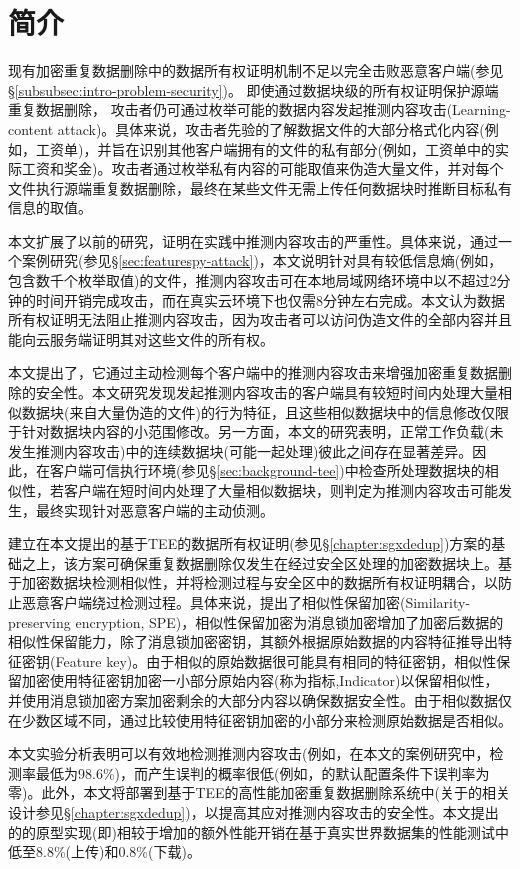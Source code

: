 \section{简介}
\label{sec:featurespy-intro}

现有加密重复数据删除中的数据所有权证明机制不足以完全击败恶意客户端(参见\S\ref{subsubsec:intro-problem-security})。 即使通过数据块级的所有权证明保护源端重复数据删除， 攻击者仍可通过枚举可能的数据内容发起推测内容攻击(Learning-content attack)。具体来说，攻击者先验的了解数据文件的大部分格式化内容(例如，工资单)，并旨在识别其他客户端拥有的文件的私有部分(例如，工资单中的实际工资和奖金)。攻击者通过枚举私有内容的可能取值来伪造大量文件，并对每个文件执行源端重复数据删除，最终在某些文件无需上传任何数据块时推断目标私有信息的取值。

本文扩展了以前的研究，证明在实践中推测内容攻击的严重性。具体来说，通过一个案例研究(参见\S\ref{sec:featurespy-attack})，本文说明针对具有较低信息熵(例如，包含数千个枚举取值)的文件，推测内容攻击可在本地局域网络环境中以不超过2分钟的时间开销完成攻击，而在真实云环境下也仅需8分钟左右完成。本文认为数据所有权证明无法阻止推测内容攻击，因为攻击者可以访问伪造文件的全部内容并且能向云服务端证明其对这些文件的所有权。

本文提出了\sysnameF，它通过主动检测每个客户端中的推测内容攻击来增强加密重复数据删除的安全性。本文研究发现发起推测内容攻击的客户端具有较短时间内处理大量相似数据块(来自大量伪造的文件)的行为特征，且这些相似数据块中的信息修改仅限于针对数据块内容的小范围修改。另一方面，本文的研究表明，正常工作负载(未发生推测内容攻击)中的连续数据块(可能一起处理)彼此之间存在显著差异。因此，\sysnameF 在客户端可信执行环境(参见\S\ref{sec:background-tee})中检查所处理数据块的相似性，若客户端在短时间内处理了大量相似数据块，则判定为推测内容攻击可能发生，最终实现针对恶意客户端的主动侦测。

\sysnameF 建立在本文提出的基于TEE的数据所有权证明(参见\S\ref{chapter:sgxdedup})方案的基础之上，该方案可确保重复数据删除仅发生在经过安全区处理的加密数据块上。\sysnameF 基于加密数据块检测相似性，并将检测过程与安全区中的数据所有权证明耦合，以防止恶意客户端绕过检测过程。具体来说，\sysnameF 提出了相似性保留加密(Similarity-preserving
encryption, SPE)，相似性保留加密为消息锁加密增加了加密后数据的相似性保留能力，除了消息锁加密密钥，其额外根据原始数据的内容特征推导出特征密钥(Feature key)。由于相似的原始数据很可能具有相同的特征密钥，相似性保留加密使用特征密钥加密一小部分原始内容(称为指标,Indicator)以保留相似性，并使用消息锁加密方案加密剩余的大部分内容以确保数据安全性。由于相似数据仅在少数区域不同，\sysnameF 通过比较使用特征密钥加密的小部分来检测原始数据是否相似。

本文实验分析表明\sysnameF 可以有效地检测推测内容攻击(例如，在本文的案例研究中，检测率最低为98.6\%)，而产生误判的概率很低(例如，\sysnameF 的默认配置条件下误判率为零)。此外，本文将\sysnameF 部署到基于TEE的高性能加密重复数据删除系统\sysnameS 中(关于\sysnameS 的相关设计参见\S\ref{chapter:sgxdedup})，以提高其应对推测内容攻击的安全性。本文提出的\sysnameF 的原型实现(即\prototype)相较于\sysnameS 增加的额外性能开销在基于真实世界数据集的性能测试中低至8.8\%(上传)和0.8\%(下载)。